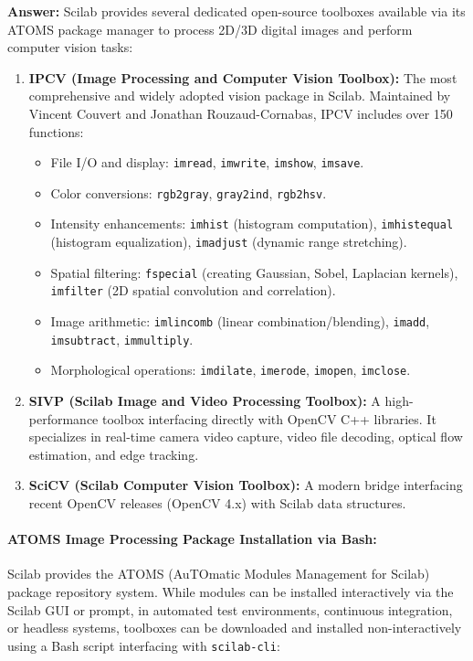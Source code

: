 \documentclass[12pt,a4paper]{article}
\begin{document}
\noindent\textbf{Answer:}
Scilab provides several dedicated open-source toolboxes available via its ATOMS package manager to process 2D/3D digital images and perform computer vision tasks:
\begin{enumerate}
    \item \textbf{IPCV (Image Processing and Computer Vision Toolbox):} The most comprehensive and widely adopted vision package in Scilab. Maintained by Vincent Couvert and Jonathan Rouzaud-Cornabas, IPCV includes over 150 functions:
    \begin{itemize}
        \item File I/O and display: \texttt{imread}, \texttt{imwrite}, \texttt{imshow}, \texttt{imsave}.
        \item Color conversions: \texttt{rgb2gray}, \texttt{gray2ind}, \texttt{rgb2hsv}.
        \item Intensity enhancements: \texttt{imhist} (histogram computation), \texttt{imhistequal} (histogram equalization), \texttt{imadjust} (dynamic range stretching).
        \item Spatial filtering: \texttt{fspecial} (creating Gaussian, Sobel, Laplacian kernels), \texttt{imfilter} (2D spatial convolution and correlation).
        \item Image arithmetic: \texttt{imlincomb} (linear combination/blending), \texttt{imadd}, \texttt{imsubtract}, \texttt{immultiply}.
        \item Morphological operations: \texttt{imdilate}, \texttt{imerode}, \texttt{imopen}, \texttt{imclose}.
    \end{itemize}
    \item \textbf{SIVP (Scilab Image and Video Processing Toolbox):} A high-performance toolbox interfacing directly with OpenCV C++ libraries. It specializes in real-time camera video capture, video file decoding, optical flow estimation, and edge tracking.
    \item \textbf{SciCV (Scilab Computer Vision Toolbox):} A modern bridge interfacing recent OpenCV releases (OpenCV 4.x) with Scilab data structures.
\end{enumerate}

\paragraph{ATOMS Image Processing Package Installation via Bash:}
Scilab provides the ATOMS (AuTOmatic Modules Management for Scilab) package repository system. While modules can be installed interactively via the Scilab GUI or prompt, in automated test environments, continuous integration, or headless systems, toolboxes can be downloaded and installed non-interactively using a Bash script interfacing with \texttt{scilab-cli}:
\end{document}
